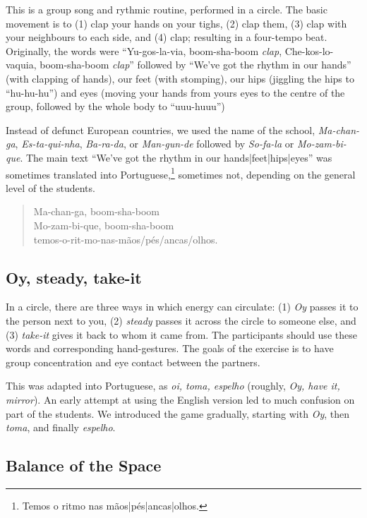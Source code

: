 \documentclass[article,twocolumn,twoside]{memoir}
\begin{document}
This is a group song and rythmic routine, performed in a circle. The basic
movement is to (1) clap your hands on your tighs, (2) clap them, (3) clap with
your neighbours to each side, and (4) clap; resulting in a four-tempo beat.
Originally, the words were ``Yu-gos-la-via, boom-sha-boom \textit{clap},
Che-kos-lo-vaquia, boom-sha-boom \textit{clap}'' followed by ``We've got the
rhythm in our hands'' (with clapping of hands), our feet (with stomping), our
hips (jiggling the hips to ``hu-hu-hu'') and eyes (moving your hands from yours
eyes to the centre of the group, followed by the whole body to ``uuu-huuu'')

Instead of defunct European countries, we used the name of the school,
\textit{Ma-chan-ga}, \textit{Es-ta-qui-nha}, \textit{Ba-ra-da}, or
\textit{Man-gun-de} followed by \textit{So-fa-la} or \textit{Mo-zam-bi-que}.
The main text ``We've got the rhythm in our hands|feet|hips|eyes'' was
sometimes translated into Portuguese,\footnote{Temos o ritmo nas
mãos|pés|ancas|olhos.} sometimes not, depending on the general level of the
students.

\begin{verse}
Ma-chan-ga, boom-sha-boom\\
Mo-zam-bi-que, boom-sha-boom\\
temos-o-rit-mo-nas-mãos/pés/ancas/olhos.
\end{verse}


\subsection{Oy, steady, take-it}
In a circle, there are three ways in which energy can circulate: (1)
\textit{Oy} passes it to the person next to you, (2) \textit{steady} passes it
across the circle to someone else, and (3) \textit{take-it} gives it back to
whom it came from. The participants should use these words and corresponding
hand-gestures. The goals of the exercise is to have group concentration and eye
contact between the partners.

This was adapted into Portuguese, as \textit{oi, toma, espelho} (roughly,
\textit{Oy, have it, mirror}). An early attempt at using the English version
led to much confusion on part of the students. We introduced the game
gradually, starting with \textit{Oy}, then \textit{toma}, and finally
\textit{espelho}.

\subsection{Balance of the Space}
\end{document}
